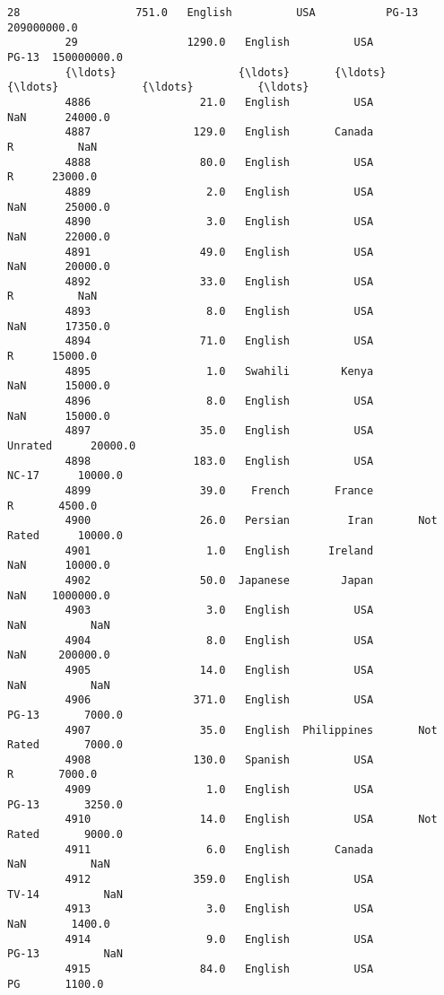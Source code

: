 \documentclass[11pt]{article}
\begin{document}
\begin{Verbatim}[commandchars=\\\{\}]
         28                  751.0   English          USA           PG-13  209000000.0   
         29                 1290.0   English          USA           PG-13  150000000.0   
         {\ldots}                   {\ldots}       {\ldots}          {\ldots}             {\ldots}          {\ldots}   
         4886                 21.0   English          USA             NaN      24000.0   
         4887                129.0   English       Canada               R          NaN   
         4888                 80.0   English          USA               R      23000.0   
         4889                  2.0   English          USA             NaN      25000.0   
         4890                  3.0   English          USA             NaN      22000.0   
         4891                 49.0   English          USA             NaN      20000.0   
         4892                 33.0   English          USA               R          NaN   
         4893                  8.0   English          USA             NaN      17350.0   
         4894                 71.0   English          USA               R      15000.0   
         4895                  1.0   Swahili        Kenya             NaN      15000.0   
         4896                  8.0   English          USA             NaN      15000.0   
         4897                 35.0   English          USA         Unrated      20000.0   
         4898                183.0   English          USA           NC-17      10000.0   
         4899                 39.0    French       France               R       4500.0   
         4900                 26.0   Persian         Iran       Not Rated      10000.0   
         4901                  1.0   English      Ireland             NaN      10000.0   
         4902                 50.0  Japanese        Japan             NaN    1000000.0   
         4903                  3.0   English          USA             NaN          NaN   
         4904                  8.0   English          USA             NaN     200000.0   
         4905                 14.0   English          USA             NaN          NaN   
         4906                371.0   English          USA           PG-13       7000.0   
         4907                 35.0   English  Philippines       Not Rated       7000.0   
         4908                130.0   Spanish          USA               R       7000.0   
         4909                  1.0   English          USA           PG-13       3250.0   
         4910                 14.0   English          USA       Not Rated       9000.0   
         4911                  6.0   English       Canada             NaN          NaN   
         4912                359.0   English          USA           TV-14          NaN   
         4913                  3.0   English          USA             NaN       1400.0   
         4914                  9.0   English          USA           PG-13          NaN   
         4915                 84.0   English          USA              PG       1100.0   
         

\end{Verbatim}
\end{document}
